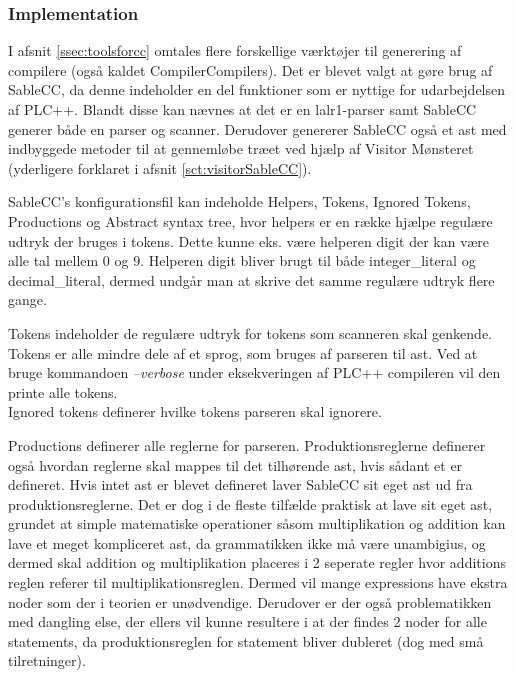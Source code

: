 \subsubsection{Implementation}

I afsnit \ref{ssec:toolsforcc} omtales flere forskellige værktøjer til generering af compilere (også kaldet CompilerCompilers). Det er blevet valgt at gøre brug af SableCC, da denne indeholder en del funktioner som er nyttige for udarbejdelsen af PLC++. Blandt disse kan nævnes at det er en \gls{lalr}1-parser samt SableCC generer både en parser og scanner. Derudover genererer SableCC også et \gls{ast} med indbyggede metoder til at gennemløbe træet ved hjælp af Visitor Mønsteret (yderligere forklaret i afsnit \ref{sct:visitorSableCC}).

\noindent SableCC's konfigurationsfil kan indeholde Helpers, Tokens, Ignored Tokens, Productions og Abstract syntax tree, hvor helpers er en række hjælpe regulære udtryk der bruges i tokens. Dette kunne eks. være helperen digit der kan være alle tal mellem 0 og 9. Helperen digit bliver brugt til både integer\_literal og decimal\_literal, dermed undgår man at skrive det samme regulære udtryk flere gange.

\noindent Tokens indeholder de regulære udtryk for tokens som scanneren skal genkende. Tokens er alle mindre dele af et sprog, som bruges af parseren til \gls{ast}. Ved at bruge kommandoen \textit{--verbose} under eksekveringen af PLC++ compileren vil den printe alle tokens.\\

\noindent Ignored tokens definerer hvilke tokens parseren skal ignorere.

\noindent Productions definerer alle reglerne for parseren. Produktionsreglerne definerer også hvordan reglerne skal mappes til det tilhørende \gls{ast}, hvis sådant et er defineret. Hvis intet \gls{ast} er blevet defineret laver SableCC sit eget \gls{ast} ud fra produktionsreglerne. Det er dog i de fleste tilfælde praktisk at lave sit eget \gls{ast}, grundet at simple matematiske operationer såsom multiplikation og addition kan lave et meget kompliceret \gls{ast}, da grammatikken ikke må være unambigius, og dermed skal addition og multiplikation placeres i 2 seperate regler hvor additions reglen referer til multiplikationsreglen. Dermed vil mange expressions have ekstra noder som der i teorien er unødvendige. Derudover er der også problematikken med dangling else, der ellers vil kunne resultere i at der findes 2 noder for alle statements, da produktionsreglen for statement bliver dubleret (dog med små tilretninger).\\ 

